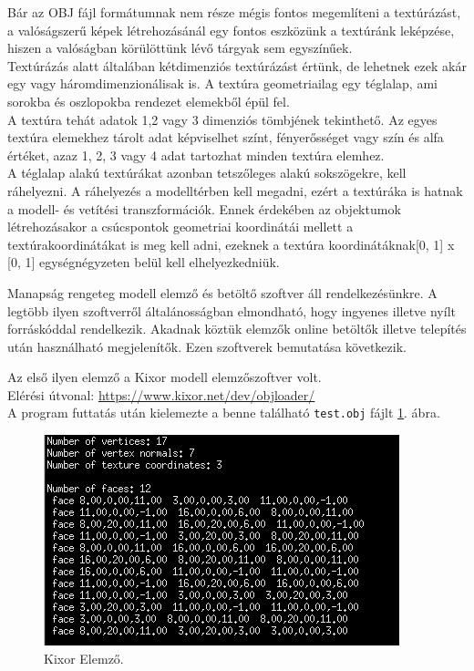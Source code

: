 Bár az OBJ fájl formátumnak nem része mégis fontos megemlíteni a textúrázást, a valóságszerű képek létrehozásánál egy fontos eszközünk a textúránk leképzése, hiszen a valóságban körülöttünk lévő tárgyak sem egyszínűek.\\

Textúrázás alatt általában kétdimenziós textúrázást értünk, de lehetnek ezek akár egy vagy háromdimenzionálisak is. A textúra geometriailag egy téglalap, ami sorokba és oszlopokba rendezet elemekből épül fel.\\

A textúra tehát adatok 1,2 vagy 3 dimenziós tömbjének tekinthető. Az egyes textúra elemekhez tárolt adat képviselhet színt, fényerősséget vagy szín és alfa értéket, azaz 1, 2, 3 vagy 4 adat  tartozhat minden textúra elemhez.\\

A téglalap alakú textúrákat azonban tetszőleges alakú sokszögekre, kell ráhelyezni. A ráhelyezés a modelltérben kell megadni, ezért  a textúráka is hatnak a modell- és vetítési transzformációk. Ennek érdekében az objektumok létrehozásakor a csúcspontok geometriai koordinátái mellett a textúrakoordinátákat is meg kell adni, ezeknek a textúra koordinátáknak[0, 1] x [0, 1] egységnégyzeten belül kell elhelyezkedniük. \cite{juhasz2003opengl}

\newpage
{}

Manapság rengeteg modell elemző és betöltő szoftver áll rendelkezésünkre. A legtöbb ilyen szoftverről általánosságban elmondható, hogy ingyenes illetve  nyílt forráskóddal rendelkezik. Akadnak köztük elemzők online betöltők illetve telepítés után használható megjelenítők. Ezen szoftverek bemutatása következik.

Az első ilyen elemző a Kixor modell elemzőszoftver volt.\cite{micah1987markup}\\
Elérési útvonal: \url{https://www.kixor.net/dev/objloader/}\\

A program futtatás után kielemezte a benne található \texttt{test.obj} fájlt \ref{fig:kixor}. ábra.
\bigskip
\begin{figure}[h]
\centering
\includegraphics[scale=0.8]{images/kixor.png}
\caption{Kixor Elemző.}
\label{fig:kixor}
\end{figure}
\bigskip


